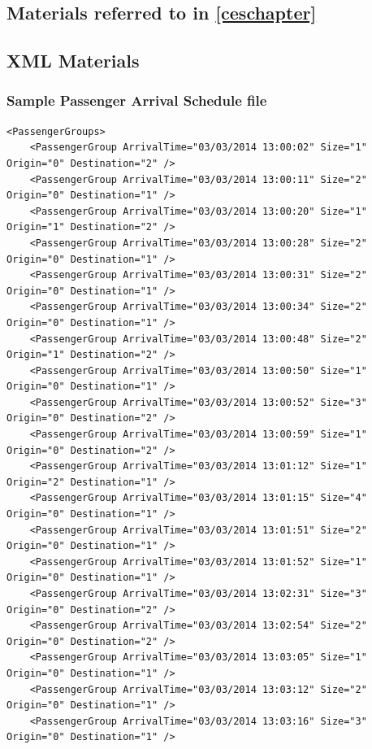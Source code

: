\documentclass{UoYCSproject}
\begin{document}
\appendix
\begin{appendices}

\chapter{Materials referred to in \autoref{ceschapter}}

\section{XML Materials}

\subsection{Sample Passenger Arrival Schedule file}

\lstset{language=XML}
\begin{lstlisting}
<PassengerGroups>
	<PassengerGroup ArrivalTime="03/03/2014 13:00:02" Size="1" Origin="0" Destination="2" />
	<PassengerGroup ArrivalTime="03/03/2014 13:00:11" Size="2" Origin="0" Destination="1" />
	<PassengerGroup ArrivalTime="03/03/2014 13:00:20" Size="1" Origin="1" Destination="2" />
	<PassengerGroup ArrivalTime="03/03/2014 13:00:28" Size="2" Origin="0" Destination="1" />
	<PassengerGroup ArrivalTime="03/03/2014 13:00:31" Size="2" Origin="0" Destination="1" />
	<PassengerGroup ArrivalTime="03/03/2014 13:00:34" Size="2" Origin="0" Destination="1" />
	<PassengerGroup ArrivalTime="03/03/2014 13:00:48" Size="2" Origin="1" Destination="2" />
	<PassengerGroup ArrivalTime="03/03/2014 13:00:50" Size="1" Origin="0" Destination="1" />
	<PassengerGroup ArrivalTime="03/03/2014 13:00:52" Size="3" Origin="0" Destination="2" />
	<PassengerGroup ArrivalTime="03/03/2014 13:00:59" Size="1" Origin="0" Destination="2" />
	<PassengerGroup ArrivalTime="03/03/2014 13:01:12" Size="1" Origin="2" Destination="1" />
	<PassengerGroup ArrivalTime="03/03/2014 13:01:15" Size="4" Origin="0" Destination="1" />
	<PassengerGroup ArrivalTime="03/03/2014 13:01:51" Size="2" Origin="0" Destination="1" />
	<PassengerGroup ArrivalTime="03/03/2014 13:01:52" Size="1" Origin="0" Destination="1" />
	<PassengerGroup ArrivalTime="03/03/2014 13:02:31" Size="3" Origin="0" Destination="2" />
	<PassengerGroup ArrivalTime="03/03/2014 13:02:54" Size="2" Origin="0" Destination="2" />
	<PassengerGroup ArrivalTime="03/03/2014 13:03:05" Size="1" Origin="0" Destination="1" />
	<PassengerGroup ArrivalTime="03/03/2014 13:03:12" Size="2" Origin="0" Destination="1" />
	<PassengerGroup ArrivalTime="03/03/2014 13:03:16" Size="3" Origin="0" Destination="1" />

\end{lstlisting}
\end{appendices}
\end{document}
